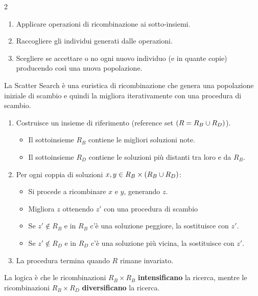 \documentclass[\main/main.tex]{subfiles}
\begin{document}
\begin{multicols}{2}
\begin{observation}
\begin{enumerate}
\begin{enumerate}
            \item Applicare operazioni di ricombinazione ai sotto-insiemi.
            \item Raccogliere gli individui generati dalle operazioni.
            \item Scegliere se accettare o no ogni nuovo individuo (e in quante copie) producendo così una nuova popolazione.
        \end{enumerate}
    \end{enumerate}
\end{observation}
\begin{definition}
    La Scatter Search è una euristica di ricombinazione che genera una popolazione iniziale di scambio e quindi la migliora iterativamente con una procedura di scambio.
    \begin{enumerate}
        \item Costruisce un insieme di riferimento (reference set \(\left(R = R_B \cup R_D\right)\)).
        \begin{itemize}
            \item Il sottoinsieme \(R_B\) contiene le migliori soluzioni note.
            \item Il sottoinsieme \(R_D\) contiene le soluzioni più distanti tra loro e da \(R_B\).
        \end{itemize}
        \item Per ogni coppia di soluzioni \(x, y \in R_B \times \left(R_B \cup R_D\right)\):
        \begin{itemize}
            \item Si procede a ricombinare \(x\) e \(y\), generando \(z\).
            \item Migliora \(z\) ottenendo \(z'\) con una procedura di scambio
            \item Se \(z' \not\in R_B\) e in \(R_B\) c'è una soluzione peggiore, la sostituisce con \(z'\).
            \item Se \(z' \not\in R_D\) e in \(R_D\) c'è una soluzione più vicina, la sostituisce con \(z'\).
        \end{itemize}
        \item La procedura termina quando \(R\) rimane invariato.
    \end{enumerate}
    La logica è che le ricombinazioni \(R_B \times R_B\) \textbf{intensificano} la ricerca, mentre le ricombinazioni \(R_B \times R_D\) \textbf{diversificano} la ricerca.
\end{definition}
\begin{definition}

\end{definition}
\end{multicols}
\end{document}
